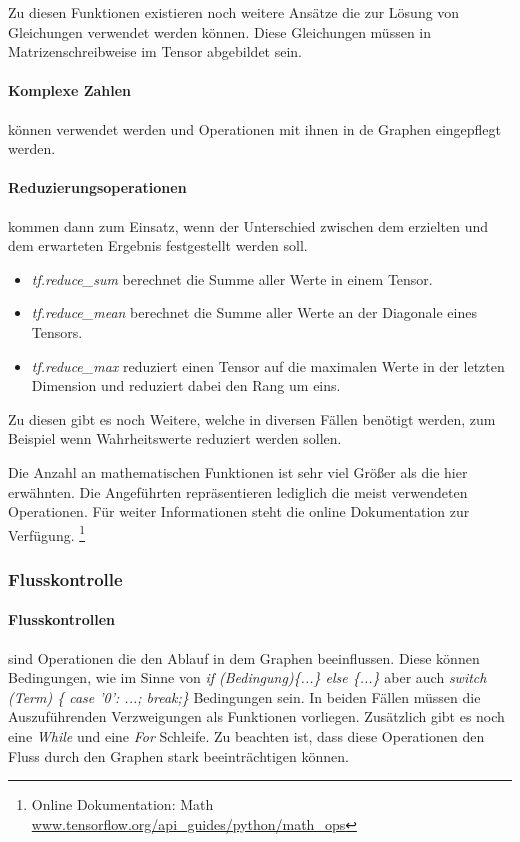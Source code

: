 Zu diesen Funktionen existieren noch weitere Ansätze die zur Lösung von Gleichungen verwendet werden können. 
Diese Gleichungen müssen in Matrizenschreibweise im Tensor abgebildet sein. 

\paragraph{Komplexe Zahlen} können verwendet werden und Operationen mit ihnen in de Graphen eingepflegt werden. 

\paragraph{Reduzierungsoperationen} kommen dann zum Einsatz, wenn der Unterschied zwischen dem erzielten und dem erwarteten Ergebnis festgestellt werden soll. 
\begin{itemize}
	\item \textit{tf.reduce\_sum} berechnet die Summe aller Werte in einem Tensor.
	\item \textit{tf.reduce\_mean} berechnet die Summe aller Werte an der Diagonale eines Tensors. 
	\item \textit{tf.reduce\_max} reduziert einen Tensor auf die maximalen Werte in der letzten Dimension und reduziert dabei den Rang um eins.
\end{itemize}

\noindent
Zu diesen gibt es noch Weitere, welche in diversen Fällen benötigt werden, zum Beispiel wenn Wahrheitswerte reduziert werden sollen. \newline

\noindent
Die Anzahl an mathematischen Funktionen ist sehr viel Größer als die hier erwähnten. 
Die Angeführten repräsentieren lediglich die meist verwendeten Operationen. 
Für weiter Informationen steht die online Dokumentation zur Verfügung. \footnote{Online Dokumentation: Math  \url{www.tensorflow.org/api_guides/python/math_ops}}

\subsubsection{Flusskontrolle}

\paragraph{Flusskontrollen} sind Operationen die den Ablauf in dem Graphen beeinflussen. 
Diese können Bedingungen, wie im Sinne von \textit{if (Bedingung)\{...\} else \{...\}} aber auch \textit{switch (Term) \{ case '0': ...; break;\}} Bedingungen sein. 
In beiden Fällen müssen die Auszuführenden Verzweigungen als Funktionen vorliegen. 
Zusätzlich gibt es noch eine \textit{While} und eine \textit{For} Schleife. 
Zu beachten ist, dass diese Operationen den Fluss durch den Graphen stark beeinträchtigen können.

